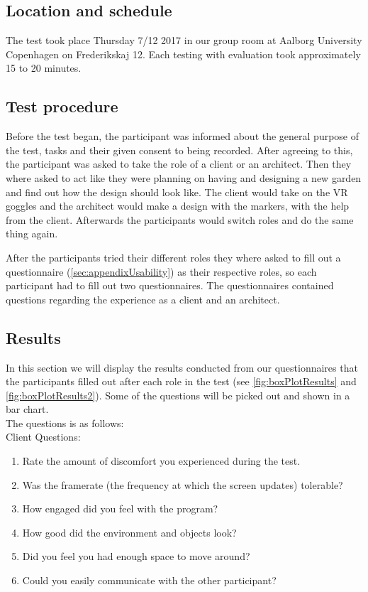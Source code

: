 \subsection*{Location and schedule}
The test took place Thursday 7/12 2017 in our group room at Aalborg University Copenhagen on Frederikskaj 12. Each testing with evaluation took approximately 15 to 20 minutes.

\subsection*{Test procedure}
Before the test began, the participant was informed about the general purpose of the test, tasks and their given consent to being recorded. After agreeing to this, the participant was asked to take the role of a client or an architect. Then they where asked to act like they were planning on having and designing a new garden and find out how the design should look like. The client would take on the VR goggles and the architect would make a design with the markers, with the help from the client. Afterwards the participants would switch roles and do the same thing again.

After the participants tried their different roles they where asked to fill out a questionnaire (\ref{sec:appendixUsability}) as their respective roles, so each participant had to fill out two questionnaires. The questionnaires contained questions regarding the experience as a client and an architect.

\subsection{Results}
In this section we will display the results conducted from our questionnaires that the participants filled out after each role in the test (see \autoref{fig:boxPlotResults} and \autoref{fig:boxPlotResults2}). Some of the questions will be picked out and shown in a bar chart.\\
The questions is as follows:\\

Client Questions:\\
\begin{enumerate}
\item Rate the amount of discomfort you experienced during the test.
\item Was the framerate (the frequency at which the screen updates) tolerable?
\item How engaged did you feel with the program?
\item How good did the environment and objects look?
\item Did you feel you had enough space to move around?
\item Could you easily communicate with the other participant?
\end{enumerate}


